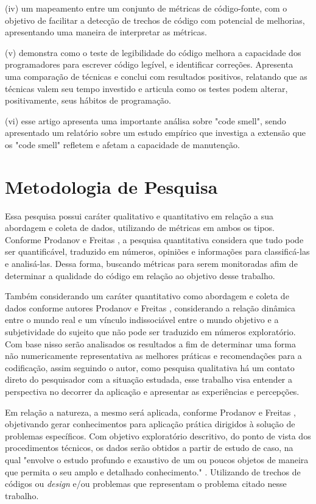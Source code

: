 \documentclass[12pt]{article}
\begin{document}
 (iv) \cite{TR_CLEAN_CODE_METRICA} um mapeamento entre um conjunto de métricas de código-fonte, com o objetivo de facilitar a detecção de trechos de código com potencial de melhorias, apresentando uma maneira de interpretar as métricas.

 (v) \cite{CODE_READABILITY_TESTING_STUDY} demonstra
como o teste de legibilidade do código melhora a capacidade dos programadores
para escrever código legível, e identificar correções. Apresenta uma comparação de técnicas e conclui com resultados positivos, relatando que as técnicas valem seu tempo investido e articula como os testes podem alterar, positivamente, seus hábitos de programação.

 (vi) \cite{CODE_SMELLS_REFLECT_IMPORTANT_MAINTAINABILITY_ASPECTS} esse artigo apresenta uma importante análisa sobre "code smell", sendo apresentado um relatório sobre um estudo empírico que investiga a extensão que os "code smell" refletem e afetam a capacidade de manutenção.

\part{Metodologia de Pesquisa} \label{sec:metodologia_Pesquisa}

Essa pesquisa possui caráter qualitativo e quantitativo em relação a sua abordagem e coleta de dados, utilizando de métricas em ambos os tipos. Conforme Prodanov e Freitas \cite{METOLOGIA}, a pesquisa quantitativa  considera que tudo pode ser quantificável, traduzido em números, opiniões e informações para classificá-las e analisá-las. Dessa forma, buscando métricas para serem monitoradas afim de determinar a qualidade do código em relação ao objetivo desse trabalho.

Também considerando um caráter quantitativo como abordagem e coleta de dados conforme autores Prodanov e Freitas \cite{METOLOGIA}, considerando a relação dinâmica entre o mundo real e um  vínculo  indissociável  entre  o  mundo  objetivo e  a  subjetividade  do  sujeito  que  não  pode  ser  traduzido  em  números
exploratório. Com base nisso serão analisados os resultados a fim de determinar uma forma não numericamente representativa as melhores práticas e recomendações para a codificação, assim seguindo o autor, como pesquisa qualitativa há um contato direto do pesquisador com a situação estudada, esse trabalho visa entender a perspectiva no decorrer da aplicação e apresentar as experiências e percepções.

Em relação a natureza, 	a mesmo será aplicada, conforme Prodanov e Freitas \cite{METOLOGIA}, objetivando gerar conhecimentos para aplicação prática dirigidos à solução de problemas específicos. Com objetivo exploratório descritivo, do ponto de vista dos procedimentos técnicos, os dados serão obtidos a partir de estudo de caso, na qual "envolve  o  estudo  profundo  e  exaustivo  de  um  ou  poucos  objetos  de  maneira  que  permita  o  seu  amplo  e  detalhado  conhecimento." \cite{METOLOGIA}. Utilizando de trechos de códigos ou \textit{design} e/ou problemas que representam o problema citado nesse trabalho.
\end{document}
